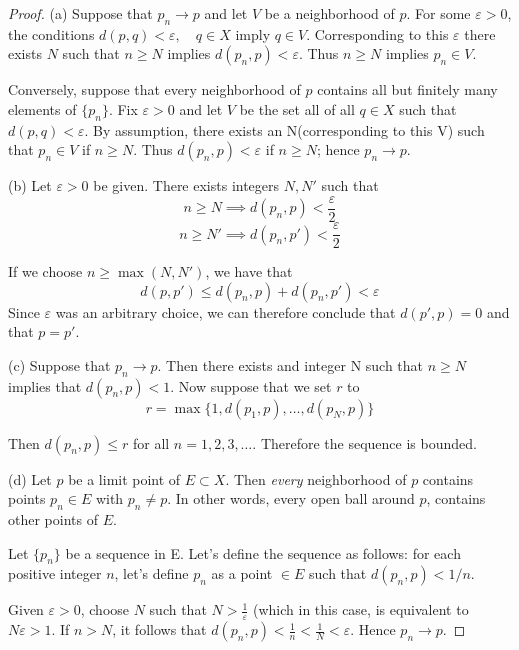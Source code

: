 \documentclass{tufte-book}
\theoremstyle{definition}
\numberwithin{section}{chapter}
\begin{document}
\begin{proof}
(a) Suppose that $p_n \to p$ and let $V$ be a neighborhood of $p$.  For some $\varepsilon > 0 $, the conditions $d(p,q)< \varepsilon, \quad q \in X$ imply $q \in V$.  Corresponding to this $\varepsilon$ there exists $N$ such that $n \geq N$ implies $d(p_n, p)< \varepsilon$.  Thus $n \geq N$ implies $p_n \in V$.

Conversely, suppose that every neighborhood of $p$ contains all but finitely many elements of $\{p_n\}$.  Fix $\varepsilon>0$ and let $V$ be the set all of all $q \in X$ such that $d(p,q)< \varepsilon$.  By assumption, there exists an N(corresponding to this V) such that $p_n \in V$ if $n \geq N$.  Thus $d(p_n, p) < \varepsilon$ if $n \geq N$; hence $p_n \to p$.

(b)  Let $\varepsilon > 0$ be given.  There exists integers $N, N'$ such that
\[n\geq N \implies d(p_n, p) < \frac{\varepsilon}{2}\]
\[n \geq N' \implies d(p_n, p') < \frac{\varepsilon}{2}\]

If we choose $n\geq \max(N, N')$, we have that 
\[d(p,p') \leq d(p_n,p) + d(p_n, p') < \varepsilon\]
Since $\varepsilon$ was an arbitrary choice, we can therefore conclude that $d(p',p) =0$ and that $p=p'$.

(c)  Suppose that $p_n \to p$.  Then there exists and integer N such that $n\geq N$ implies that $d(p_n, p) < 1$.  Now suppose that we set $r$ to
\[r = \max \{1, d(p_1, p), \ldots, d(p_N, p)\}\]

Then $d(p_n, p) \leq r$ for all $n =1, 2, 3, \ldots$.  Therefore the sequence is bounded.

(d) Let $p$ be a limit point of $E \subset X$.  Then \emph{every} neighborhood of $p$ contains points $p_n\in E$ with $p_n\neq p$. In other words, every open ball around $p$, contains other points of $E$.  

Let $\{p_n\}$ be a sequence in E.  Let's define the sequence as follows:  for each positive integer $n$,  let's define $p_n$ as a point $\in E$ such that $d(p_n, p) < 1/n$.  

Given $\varepsilon > 0$, choose $N$ such that $N > \frac{1}{\varepsilon}$ (which in this case, is equivalent to $N\varepsilon>1$.  If $n > N$, it follows that $d(p_n, p)< \frac{1}{n} < \frac{1}{N} < \varepsilon$.  Hence $p_n \to p$.
\end{proof}
\end{document}
